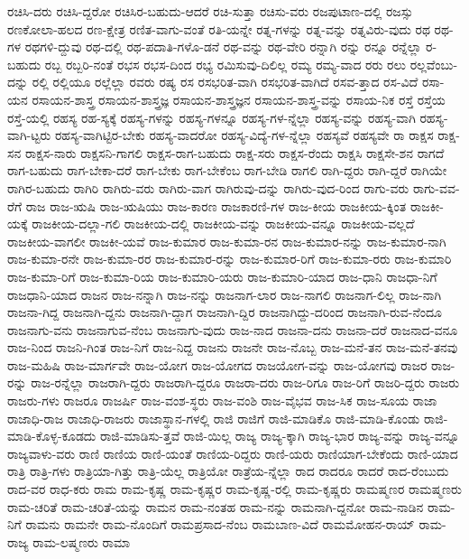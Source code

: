 {ರಚಿಸಿ-ದರು
ರಚಿಸಿ-ದ್ದರೋ
ರಚಿಸಿರ-ಬಹುದು-ಆದರೆ
ರಚಿ-ಸುತ್ತಾ
ರಚಿಸು-ವರು
ರಜಪುಟಾಣ-ದಲ್ಲಿ
ರಜಸ್ಸು
ರಣಕೋಲಾ-ಹಲದ
ರಣ-ಕ್ಷೇತ್ರ
ರಣಿತ-ವಾಗು-ವಂತೆ
ರತಿ-ಯನ್ನೇ
ರತ್ನ-ಗಳನ್ನು
ರತ್ನ-ವನ್ನು
ರತ್ನವಿರು-ವುದು
ರಥ
ರಥ-ಗಳ
ರಥಗಳಿ-ದ್ದುವು
ರಥ-ದಲ್ಲಿ
ರಥ-ಪದಾತಿ-ಗಳೊ-ಡನೆ
ರಥ-ವನ್ನು
ರಥ-ವೇರಿ
ರನ್ನಾಗಿ
ರನ್ನು
ರನ್ನೂ
ರನ್ನೆಲ್ಲಾ
ರ-ಬಹುದು
ರಬ್ಬ
ರಬ್ಬರಿ-ನಂತೆ
ರಭಸ
ರಭಸ-ದಿಂದ
ರಭ್ಯ
ರಮಿಸುವು-ದಿಲಿಲ್ಲ
ರಮ್ಯ
ರಮ್ಯ-ವಾದ
ರರು
ರಲು
ರಲ್ಲವೆಂಬು-ದನ್ನು
ರಲ್ಲಿ
ರಲ್ಲಿಯೂ
ರಲ್ಲೆಲ್ಲಾ
ರವರು
ರಷ್ಯ
ರಸ
ರಸಭರಿತ-ವಾಗಿ
ರಸಭರಿತ-ವಾಗಿದೆ
ರಸವ-ತ್ತಾದ
ರಸ-ವಿದೆ
ರಸಾ-ಯನ
ರಸಾಯನ-ಶಾಸ್ತ್ರ
ರಸಾಯನ-ಶಾಸ್ತ್ರಜ್ಞ
ರಸಾಯನ-ಶಾಸ್ತ್ರಜ್ಞನ
ರಸಾಯನ-ಶಾಸ್ತ್ರ-ವನ್ನು
ರಸಾಯ-ನಿಕ
ರಸ್ತೆ
ರಸ್ತೆಯ
ರಸ್ತೆ-ಯಲ್ಲಿ
ರಹಸ್ಯ
ರಹ-ಸ್ಯಕ್ಕೆ
ರಹಸ್ಯ-ಗಳನ್ನು
ರಹಸ್ಯ-ಗಳನ್ನೂ
ರಹಸ್ಯ-ಗಳ-ನ್ನೆಲ್ಲಾ
ರಹಸ್ಯ-ವನ್ನು
ರಹಸ್ಯ-ವಾಗಿ
ರಹಸ್ಯ-ವಾಗಿ-ಟ್ಟರು
ರಹಸ್ಯ-ವಾಗಿಟ್ಟಿರ-ಬೇಕು
ರಹಸ್ಯ-ವಾದರೋ
ರಹಸ್ಯ-ವಿದ್ಯೆ-ಗಳ-ನ್ನೆಲ್ಲಾ
ರಹಸ್ಯವೆ
ರಹಸ್ಯವೇ
ರಾ
ರಾಕ್ಷಸ
ರಾಕ್ಷ-ಸನ
ರಾಕ್ಷಸ-ನಾರು
ರಾಕ್ಷಸನಿ-ಗಾಗಲಿ
ರಾಕ್ಷಸ-ರಾಗ-ಬಹುದು
ರಾಕ್ಷ-ಸರು
ರಾಕ್ಷಸ-ರೆಂದು
ರಾಕ್ಷಸಿ
ರಾಕ್ಷಸೇ-ಶನ
ರಾಗದೆ
ರಾಗ-ಬಹುದು
ರಾಗ-ಬೇಕಾ-ದರೆ
ರಾಗ-ಬೇಕು
ರಾಗ-ಬೇಕೆಂಬ
ರಾಗ-ಬೇಡಿ
ರಾಗಲಿ
ರಾಗಿ-ದ್ದರು
ರಾಗಿ-ದ್ದರೆ
ರಾಗಿಯೇ
ರಾಗಿರ-ಬಹುದು
ರಾಗಿರಿ
ರಾಗಿರು-ವರು
ರಾಗಿರು-ವಾಗ
ರಾಗಿರುವು-ದನ್ನು
ರಾಗಿರು-ವುದ-ರಿಂದ
ರಾಗು-ವರು
ರಾಗು-ವವ-ರೆಗೆ
ರಾಜ
ರಾಜ-ಋಷಿ
ರಾಜ-ಋಷಿಯು
ರಾಜ-ಕಾರಣ
ರಾಜಕಾರಣಿ-ಗಳ
ರಾಜ-ಕೀಯ
ರಾಜಕೀಯ-ಕ್ಕಿಂತ
ರಾಜಕೀ-ಯಕ್ಕೆ
ರಾಜಕೀಯ-ದಲ್ಲಾ-ಗಲಿ
ರಾಜಕೀಯ-ದಲ್ಲಿ
ರಾಜಕೀಯ-ವನ್ನು
ರಾಜಕೀಯ-ವನ್ನೂ
ರಾಜಕೀಯ-ವಲ್ಲದೆ
ರಾಜಕೀಯ-ವಾಗಲೀ
ರಾಜಕೀ-ಯವೆ
ರಾಜ-ಕುಮಾರ
ರಾಜ-ಕುಮಾ-ರನ
ರಾಜ-ಕುಮಾರ-ನನ್ನು
ರಾಜ-ಕುಮಾರ-ನಾಗಿ
ರಾಜ-ಕುಮಾ-ರನೇ
ರಾಜ-ಕುಮಾ-ರರ
ರಾಜ-ಕುಮಾರ-ರನ್ನು
ರಾಜ-ಕುಮಾರ-ರಿಗೆ
ರಾಜ-ಕುಮಾ-ರರು
ರಾಜ-ಕುಮಾರಿ
ರಾಜ-ಕುಮಾ-ರಿಗೆ
ರಾಜ-ಕುಮಾ-ರಿಯ
ರಾಜ-ಕುಮಾರಿ-ಯರು
ರಾಜ-ಕುಮಾರಿ-ಯಾದ
ರಾಜ-ಧಾನಿ
ರಾಜಧಾ-ನಿಗೆ
ರಾಜಧಾನಿ-ಯಾದ
ರಾಜನ
ರಾಜ-ನನ್ನಾಗಿ
ರಾಜ-ನನ್ನು
ರಾಜನಾಗ-ಲಾರ
ರಾಜ-ನಾಗಲಿ
ರಾಜನಾಗ-ಲಿಲ್ಲ
ರಾಜ-ನಾಗಿ
ರಾಜನಾ-ಗಿದ್ದ
ರಾಜನಾಗಿ-ದ್ದನು
ರಾಜನಾಗಿ-ದ್ದಾಗ
ರಾಜನಾಗಿ-ದ್ದಿರ
ರಾಜನಾಗಿದ್ದು-ದರಿಂದ
ರಾಜನಾಗಿ-ರುವ-ನೆಂದೂ
ರಾಜನಾಗು-ವನು
ರಾಜನಾಗುವ-ನೆಂಬ
ರಾಜನಾಗು-ವುದು
ರಾಜ-ನಾದ
ರಾಜನಾ-ದನು
ರಾಜನಾ-ದರೆ
ರಾಜನಾದ-ವನೂ
ರಾಜ-ನಿಂದ
ರಾಜನಿ-ಗಿಂತ
ರಾಜ-ನಿಗೆ
ರಾಜ-ನಿದ್ದ
ರಾಜನು
ರಾಜನೇ
ರಾಜ-ನೊಬ್ಬ
ರಾಜ-ಮನೆ-ತನ
ರಾಜ-ಮನೆ-ತನವು
ರಾಜ-ಮಹಿಷಿ
ರಾಜ-ಮಾರ್ಗವೇ
ರಾಜ-ಯೋಗ
ರಾಜ-ಯೋಗದ
ರಾಜಯೋಗ-ವನ್ನು
ರಾಜ-ಯೋಗವು
ರಾಜರ
ರಾಜ-ರನ್ನು
ರಾಜ-ರನ್ನೆಲ್ಲಾ
ರಾಜರಾಗಿ-ದ್ದರು
ರಾಜರಾಗಿ-ದ್ದರೂ
ರಾಜರಾ-ದರು
ರಾಜ-ರಿಗೂ
ರಾಜ-ರಿಗೆ
ರಾಜರಿ-ದ್ದರು
ರಾಜರು
ರಾಜರು-ಗಳು
ರಾಜರೂ
ರಾಜರ್ಷಿ
ರಾಜ-ವಂಶ-ಸ್ಥರು
ರಾಜ-ವಂಶಿ
ರಾಜ-ವೈಭವ
ರಾಜ-ಸಿಕ
ರಾಜ-ಸೂಯ
ರಾಜಾ
ರಾಜಾಧಿ-ರಾಜ
ರಾಜಾಧಿ-ರಾಜರು
ರಾಜಾಸ್ಥಾನ-ಗಳಲ್ಲಿ
ರಾಜಿ
ರಾಜಿಗೆ
ರಾಜಿ-ಮಾಡಿಕೊ
ರಾಜಿ-ಮಾಡಿ-ಕೊಂಡು
ರಾಜಿ-ಮಾಡಿ-ಕೊಳ್ಳ-ಕೂಡದು
ರಾಜಿ-ಮಾಡಿಸು-ತ್ತವೆ
ರಾಜಿ-ಯಿಲ್ಲ
ರಾಜ್ಯ
ರಾಜ್ಯ-ಕ್ಕಾಗಿ
ರಾಜ್ಯ-ಭಾರ
ರಾಜ್ಯ-ವನ್ನು
ರಾಜ್ಯ-ವನ್ನೂ
ರಾಜ್ಯವಾಳು-ವರು
ರಾಣಿ
ರಾಣಿಯ
ರಾಣಿ-ಯಂತೆ
ರಾಣಿಯ-ರಿದ್ದರು
ರಾಣಿ-ಯರು
ರಾಣಿಯಾಗ-ಬೇಕೆಂದು
ರಾಣಿ-ಯಾದ
ರಾತ್ರಿ
ರಾತ್ರಿ-ಗಳು
ರಾತ್ರಿಯಾ-ಗಿತ್ತು
ರಾತ್ರಿ-ಯೆಲ್ಲ
ರಾತ್ರಿಯೋ
ರಾತ್ರೆಯ-ನ್ನೆಲ್ಲಾ
ರಾದ
ರಾದರೂ
ರಾದರೆ
ರಾದ-ರೆಂಬುದು
ರಾದ-ವರ
ರಾಧ-ಕರು
ರಾಮ
ರಾಮ-ಕೃಷ್ಣ
ರಾಮ-ಕೃಷ್ಣರ
ರಾಮ-ಕೃಷ್ಣ-ರಲ್ಲಿ
ರಾಮ-ಕೃಷ್ಣರು
ರಾಮಷ್ಮಣರ
ರಾಮಷ್ಮಣರು
ರಾಮ-ಚರಿತೆ
ರಾಮ-ಚರಿತೆ-ಯನ್ನು
ರಾಮನ
ರಾಮ-ನಂತಹ
ರಾಮ-ನನ್ನು
ರಾಮನಾಗಿ-ದ್ದನೋ
ರಾಮ-ನಾಡಿನ
ರಾಮ-ನಿಗೆ
ರಾಮನು
ರಾಮನೇ
ರಾಮ-ನೊಂದಿಗೆ
ರಾಮಪ್ರಸಾದ-ನೆಂಬ
ರಾಮಬಾಣ-ವಿದೆ
ರಾಮಮೋಹನ-ರಾಯ್
ರಾಮ-ರಾಜ್ಯ
ರಾಮ-ಲಷ್ಮಣರು
ರಾಮಾ
}
